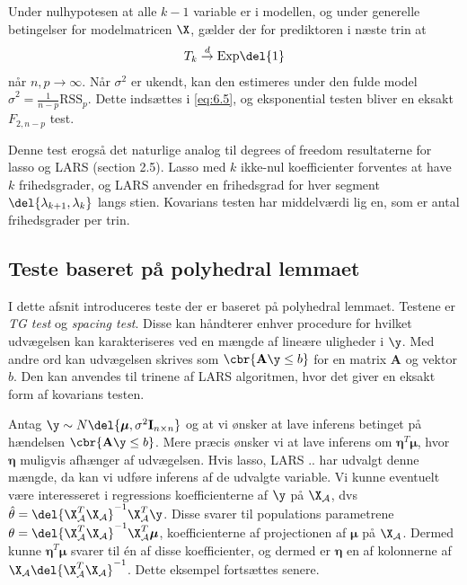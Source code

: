 Under nulhypotesen at alle $k-1$ variable er i modellen, og under generelle betingelser for modelmatricen $\X$, gælder der for prediktoren i næste trin at
\begin{align*}
T_k \overset{d}{\rightarrow} \text{Exp}\del{1}
\end{align*}
når \(n, p \rightarrow \infty\).
Når \(\sigma^2\) er ukendt, kan den estimeres under den fulde model \(\hat{\sigma}^2 = \frac{1}{n-p} \text{RSS}_p\). 
Dette indsættes i \eqref{eq:6.5}, og eksponential testen bliver en eksakt \(F_{2,n-p}\) test.

Denne test erogså det naturlige analog til degrees of freedom resultaterne for lasso og LARS (section 2.5).
Lasso med \(k\) ikke-nul koefficienter forventes at have \(k\) frihedsgrader, og LARS anvender en frihedsgrad for hver segment \(\del{\lambda_{k+1}, \lambda_k}\) langs stien.
Kovarians testen har middelværdi lig en, som er antal frihedsgrader per trin.

\subsection{Teste baseret på polyhedral lemmaet}
\citep{post_inference}


I dette afsnit introduceres teste der er baseret på polyhedral lemmaet.
Testene er \textit{TG test} og \textit{spacing test}. 
Disse kan håndterer enhver procedure for hvilket udvægelsen kan karakteriseres ved en mængde af lineære uligheder i \(\y\).
Med andre ord kan udvægelsen skrives som \(\cbr{\mathbf{A} \y \leq b}\) for en matrix \(\mathbf{A}\) og vektor \(b\).
Den kan anvendes til trinene af LARS algoritmen, hvor det giver en eksakt form af kovarians testen.

Antag \(\y \sim N\del{\boldsymbol{\mu}, \sigma^2 \mathbf{I}_{n \times n}}\) og at vi ønsker at lave inferens betinget på hændelsen \(\cbr{\mathbf{A} \y \leq b}\).
Mere præcis ønsker vi at lave inferens om \(\boldsymbol{\eta}^T \boldsymbol{\mu}\), hvor \(\boldsymbol{\eta}\) muligvis afhænger af udvægelsen.
Hvis lasso, LARS .. har udvalgt denne mængde, da kan vi udføre inferens  af de udvalgte variable.
Vi kunne eventuelt være interesseret i regressions koefficienterne af \(\y\) på \(\X_\mathcal{A}\), dvs \(\hat{\theta}= \del{\X_\mathcal{A}^T \X_\mathcal{A}}^{-1} \X_\mathcal{A}^T \y\).
Disse svarer til populations parametrene \(\theta= \del{\X_\mathcal{A}^T \X_\mathcal{A}}^{-1} \X_\mathcal{A}^T \boldsymbol{\mu}\), koefficienterne af projectionen af \(\boldsymbol{\mu}\) på \(\X_\mathcal{A}\).
Dermed kunne \(\boldsymbol{\eta}^T \boldsymbol{\mu}\) svarer til én af disse koefficienter, og dermed er \(\boldsymbol{\eta}\) en af kolonnerne af \(\X_\mathcal{A} \del{\X_\mathcal{A}^T \X_\mathcal{A}}^{-1}\). Dette eksempel fortsættes senere.

